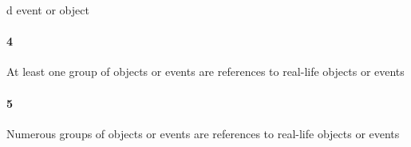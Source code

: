 d event or object\paragraph{4}At least one group of objects or events are references to real-life objects or events\paragraph{5}Numerous groups of objects or events are references to real-life objects or events\subsu